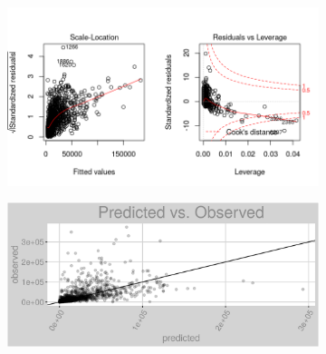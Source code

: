 \begin{figure}[h]
\centering
\begin{subfigure}{1\textwidth}
\centering
\includegraphics[width=.99\textwidth, height=0.475\textheight]{Images/electricity_lp_res_2.png}
\end{subfigure}
\begin{subfigure}{1\textwidth}
\centering
\includegraphics[width=.99\textwidth, height=0.3\textheight]{Images/electricity_lp_pvo.png}
\end{subfigure}
\end{figure}
\FloatBarrier
\newpage
